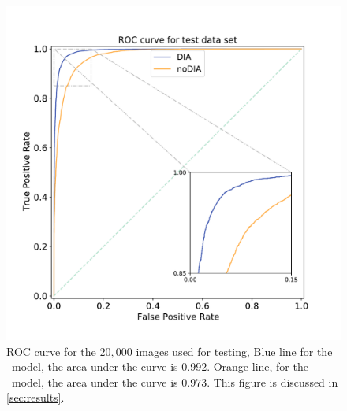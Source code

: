 \begin{figure}
    \centering
    \includegraphics[width=1\linewidth]{
    figures/ROC_zoom.pdf}
    \caption{ROC curve for the $20,000$ images used for testing, Blue line for the  \diabased\ model, the area under the curve is $0.992$. Orange line, for the \nodia\ model, the area under the curve is $0.973$. This figure is discussed in \autoref{sec:results}.}
    \label{fig:roc_models}
\end{figure}

